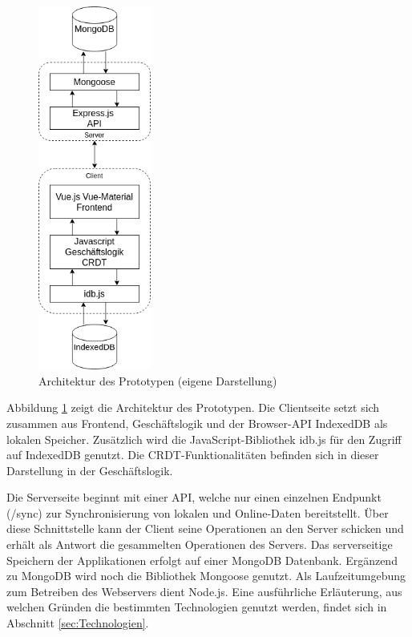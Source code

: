 \documentclass[a4paper, 12pt]{scrreprt}
\begin{document}
\begin{figure}[H]
	\centering
	\includegraphics[width=0.33\textwidth]{architektur.png}
	\caption[Architektur des Prototypen]{Architektur des Prototypen (eigene Darstellung)}
	\label{fig:architektur}
\end{figure}

Abbildung \ref{fig:architektur} zeigt die Architektur des Prototypen. Die Clientseite setzt sich zusammen aus Frontend, Geschäftslogik und der Browser-API IndexedDB als lokalen Speicher. Zusätzlich wird die JavaScript-Bibliothek idb.js für den Zugriff auf IndexedDB genutzt. Die CRDT-Funktionalitäten befinden sich in dieser Darstellung in der Geschäftslogik. 

Die Serverseite beginnt mit einer API, welche nur einen einzelnen Endpunkt (/sync) zur Synchronisierung von lokalen und Online-Daten bereitstellt. Über diese Schnittstelle kann der Client seine Operationen an den Server schicken und erhält als Antwort die gesammelten Operationen des Servers. Das serverseitige Speichern der Applikationen erfolgt auf einer MongoDB Datenbank. Ergänzend zu MongoDB wird noch die Bibliothek Mongoose genutzt. Als Laufzeitumgebung zum Betreiben des Webservers dient Node.js. Eine ausführliche Erläuterung, aus welchen Gründen die bestimmten Technologien genutzt werden, findet sich in Abschnitt \ref{sec:Technologien}.
\end{document}
